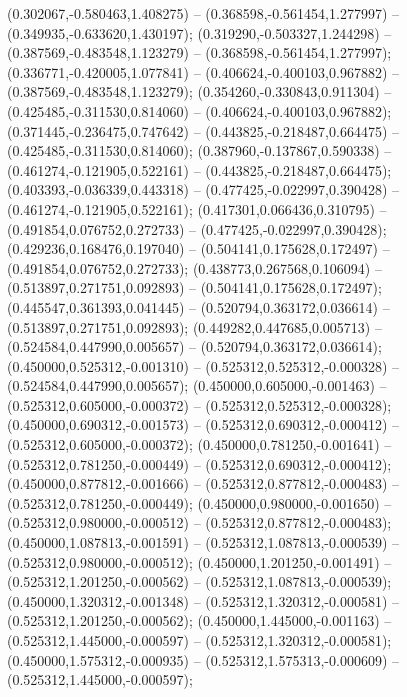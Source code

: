  (0.302067,-0.580463,1.408275) -- (0.368598,-0.561454,1.277997) -- (0.349935,-0.633620,1.430197);
 (0.319290,-0.503327,1.244298) -- (0.387569,-0.483548,1.123279) -- (0.368598,-0.561454,1.277997);
 (0.336771,-0.420005,1.077841) -- (0.406624,-0.400103,0.967882) -- (0.387569,-0.483548,1.123279);
 (0.354260,-0.330843,0.911304) -- (0.425485,-0.311530,0.814060) -- (0.406624,-0.400103,0.967882);
 (0.371445,-0.236475,0.747642) -- (0.443825,-0.218487,0.664475) -- (0.425485,-0.311530,0.814060);
 (0.387960,-0.137867,0.590338) -- (0.461274,-0.121905,0.522161) -- (0.443825,-0.218487,0.664475);
 (0.403393,-0.036339,0.443318) -- (0.477425,-0.022997,0.390428) -- (0.461274,-0.121905,0.522161);
 (0.417301,0.066436,0.310795) -- (0.491854,0.076752,0.272733) -- (0.477425,-0.022997,0.390428);
 (0.429236,0.168476,0.197040) -- (0.504141,0.175628,0.172497) -- (0.491854,0.076752,0.272733);
 (0.438773,0.267568,0.106094) -- (0.513897,0.271751,0.092893) -- (0.504141,0.175628,0.172497);
 (0.445547,0.361393,0.041445) -- (0.520794,0.363172,0.036614) -- (0.513897,0.271751,0.092893);
 (0.449282,0.447685,0.005713) -- (0.524584,0.447990,0.005657) -- (0.520794,0.363172,0.036614);
 (0.450000,0.525312,-0.001310) -- (0.525312,0.525312,-0.000328) -- (0.524584,0.447990,0.005657);
 (0.450000,0.605000,-0.001463) -- (0.525312,0.605000,-0.000372) -- (0.525312,0.525312,-0.000328);
 (0.450000,0.690312,-0.001573) -- (0.525312,0.690312,-0.000412) -- (0.525312,0.605000,-0.000372);
 (0.450000,0.781250,-0.001641) -- (0.525312,0.781250,-0.000449) -- (0.525312,0.690312,-0.000412);
 (0.450000,0.877812,-0.001666) -- (0.525312,0.877812,-0.000483) -- (0.525312,0.781250,-0.000449);
 (0.450000,0.980000,-0.001650) -- (0.525312,0.980000,-0.000512) -- (0.525312,0.877812,-0.000483);
 (0.450000,1.087813,-0.001591) -- (0.525312,1.087813,-0.000539) -- (0.525312,0.980000,-0.000512);
 (0.450000,1.201250,-0.001491) -- (0.525312,1.201250,-0.000562) -- (0.525312,1.087813,-0.000539);
 (0.450000,1.320312,-0.001348) -- (0.525312,1.320312,-0.000581) -- (0.525312,1.201250,-0.000562);
 (0.450000,1.445000,-0.001163) -- (0.525312,1.445000,-0.000597) -- (0.525312,1.320312,-0.000581);
 (0.450000,1.575312,-0.000935) -- (0.525312,1.575313,-0.000609) -- (0.525312,1.445000,-0.000597);

